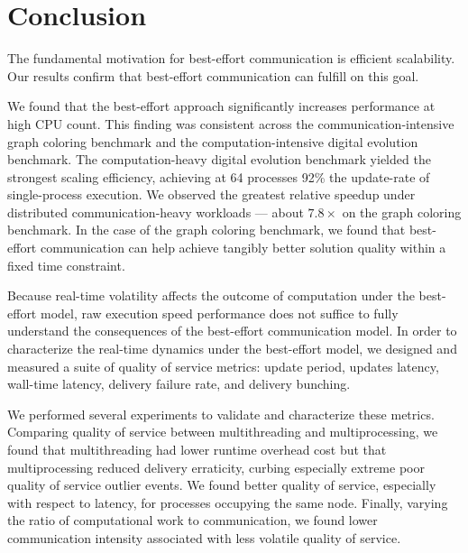 \section{Conclusion}

The fundamental motivation for best-effort communication is efficient scalability.
Our results confirm that best-effort communication can fulfill on this goal.

We found that the best-effort approach significantly increases performance at high CPU count.
This finding was consistent across the communication-intensive graph coloring benchmark and the computation-intensive digital evolution benchmark.
The computation-heavy digital evolution benchmark yielded the strongest scaling efficiency, achieving at 64 processes 92\% the update-rate of single-process execution.
We observed the greatest relative speedup under distributed communication-heavy workloads --- about $7.8\times$ on the graph coloring benchmark.
In the case of the graph coloring benchmark, we found that best-effort communication can help achieve tangibly better solution quality within a fixed time constraint.

Because real-time volatility affects the outcome of computation under the best-effort model, raw execution speed performance does not suffice to fully understand the consequences of the best-effort communication model.
In order to characterize the real-time dynamics under the best-effort model, we designed and measured a suite of quality of service metrics: update period, updates latency, wall-time latency, delivery failure rate, and delivery bunching.

We performed several experiments to validate and characterize these metrics.
Comparing quality of service between multithreading and multiprocessing, we found that multithreading had lower runtime overhead cost but that multiprocessing reduced delivery erraticity, curbing especially extreme poor quality of service outlier events.
We found better quality of service, especially with respect to latency, for processes occupying the same node.
Finally, varying the ratio of computational work to communication, we found lower communication intensity associated with less volatile quality of service.


